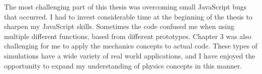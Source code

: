 The most challenging part of this thesis was overcoming small JavaScript bugs that occurred.  I had to invest considerable time at the beginning of the thesis to sharpen my JavaScript skills.  Sometimes the code confused me when using multiple different functions, based from different prototypes.  Chapter 3 was also challenging for me to apply the mechanics concepts to actual code.  These types of simulations have a wide variety of real world applications, and I have enjoyed the opportunity to expand my understanding of physics concepts in this manner.

































